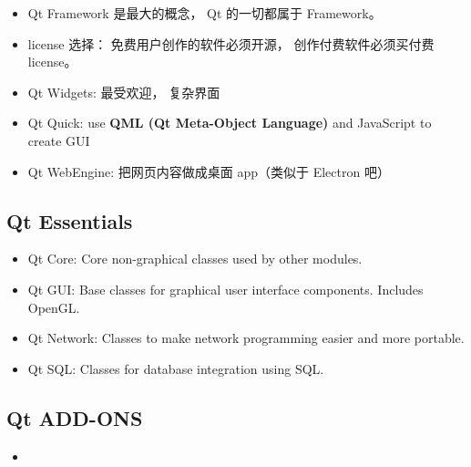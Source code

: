
\begin{issues}
\issueDraft
\end{issues}

\begin{itemize}
\item Qt Framework 是最大的概念， Qt 的一切都属于 Framework。
\item license 选择： 免费用户创作的软件必须开源， 创作付费软件必须买付费 license。
\item Qt Widgets: 最受欢迎， 复杂界面
\item Qt Quick: use \textbf{QML (Qt Meta-Object Language)} and JavaScript to create GUI
\item Qt WebEngine: 把网页内容做成桌面 app（类似于 Electron 吧）
\end{itemize}


\subsection{Qt Essentials}
\begin{itemize}
\item Qt Core: Core non-graphical classes used by other modules.
\item Qt GUI: Base classes for graphical user interface components. Includes OpenGL.
\item Qt Network: Classes to make network programming easier and more portable.
\item Qt SQL: Classes for database integration using SQL.
\end{itemize}

\subsection{Qt ADD-ONS}
\begin{itemize}
\item 
\end{itemize}
